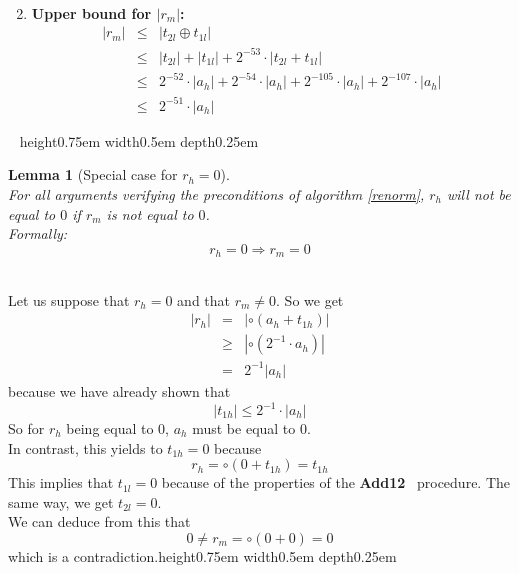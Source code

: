 \documentclass[a4paper,10pt,twoside]{article}
\newtheorem{lemma}[theorem]{Lemma}
\newenvironment{proof}[1][Proof]{\begin{trivlist}
\item[\hskip \labelsep {\bfseries #1}]}{\end{trivlist}}
\newcommand{\qed}{\nobreak \ifvmode \relax \else \ifdim \lastskip<1.5em \hskip-\lastskip
\hskip1.5em plus0em minus0.5em \fi \nobreak \vrule height0.75em width0.5em depth0.25em\fi}
\newcommand{\hi}{\ensuremath{\mathit{h}}}
\newcommand{\mi}{\ensuremath{\mathit{m}}}
\newcommand{\lo}{\ensuremath{\mathit{l}}}
\newcommand{\Add}{{\bf Add12}}
\begin{document}
\begin{proof}
\begin{enumerate}
\begin{eqnarray*}
\end{eqnarray*}
\item {\bf Upper bound for $\left \vert r_\mi \right \vert$:}
\begin{eqnarray*}
\left \vert r_\mi \right \vert & \leq & \left \vert t_{2\lo} \oplus t_{1\lo} \right \vert \\
& \leq & \left \vert t_{2\lo} \right \vert + \left \vert t_{1\lo} \right \vert + 2^{-53} \cdot \left \vert t_{2\lo} + t_{1\lo} \right \vert \\
& \leq & 2^{-52} \cdot \left \vert a_\hi \right \vert + 2^{-54} \cdot \left \vert a_\hi \right \vert + 2^{-105} \cdot \left \vert a_\hi \right \vert +
2^{-107} \cdot \left \vert a_\hi \right \vert \\
& \leq & 2^{-51} \cdot \left \vert a_\hi \right \vert
\end{eqnarray*}
\end{enumerate} ~ \qed
\end{proof}
\begin{lemma}[Special case for $r_\hi = 0$] \label{specialcaseinzero}~\\
For all arguments verifying the preconditions of algorithm \ref{renorm},
$r_\hi$ will not be equal to $0$ if $r_\mi$ is not equal to $0$. \\
Formally:
$$r_\hi = 0 \Rightarrow r_\mi = 0$$
\end{lemma}
\begin{proof} ~\\
Let us suppose that $r_\hi = 0$ and that $r_\mi \not = 0$. So we get
\begin{eqnarray*}
\left \vert r_\hi \right \vert & = & \left \vert \circ \left( a_\hi + t_{1\hi} \right) \right \vert \\
& \geq & \left \vert \circ \left( 2^{-1} \cdot a_\hi \right) \right \vert \\
& = & 2^{-1} \left \vert a_\hi \right \vert
\end{eqnarray*}
because we have already shown that $$\left \vert t_{1\hi} \right \vert \leq 2^{-1} \cdot \left \vert a_\hi \right \vert$$
So for $r_\hi$ being equal to $0$, $a_\hi$ must be equal to $0$.\\
In contrast, this yields to $t_{1\hi} = 0$ because $$r_\hi = \circ \left( 0 + t_{1\hi} \right) = t_{1\hi}$$
This implies that $t_{1\lo} = 0$ because of the properties of the \Add~
procedure.
The same way, we get $t_{2\lo} = 0$.\\
We can deduce from this that
$$0 \not = r_\mi = \circ \left( 0 + 0 \right) = 0$$ which is a contradiction.\qed
\end{proof}
\end{document}
